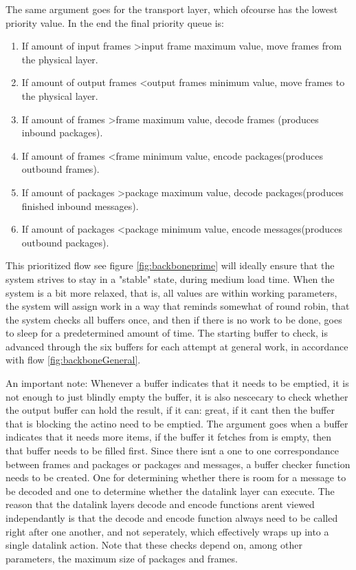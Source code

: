 The same argument goes for the transport layer, which ofcourse has the lowest priority value.
 In the end the final priority queue is:

\begin{enumerate}
\item If amount of input frames \textgreater input frame maximum value, move frames from the physical layer.
\item If amount of output frames \textless output frames minimum value, move frames to the physical layer.
\item If amount of frames \textgreater frame maximum value, decode frames (produces inbound packages).
\item If amount of frames \textless frame minimum value, encode packages(produces outbound frames).
\item If amount of packages \textgreater package maximum value, decode packages(produces finished inbound messages).
\item If amount of packages \textless package minimum value, encode messages(produces outbound packages).
\end{enumerate}
This prioritized flow see figure \ref{fig:backboneprime} will ideally ensure that the system strives to stay in a "stable" state, during medium load time.
When the system is a bit more relaxed, that is, all values are within working parameters, the system will assign work in a way that reminds somewhat of round robin, that the system checks all buffers once, and then if there is no work to be done, goes to sleep for a predetermined amount of time. The starting buffer to check, is advanced through the six buffers for each attempt at general work, in accordance with flow \ref{fig:backboneGeneral}.




An important note:
Whenever a buffer indicates that it needs to be emptied, it is not enough to just blindly empty the buffer, it is also nescecary to check whether the output buffer can hold the result, if it can: great, if it cant then the buffer that is blocking the actino need to be emptied.
The argument goes when a buffer indicates that it needs more items, if the buffer it fetches from is empty, then that buffer needs to be filled first.
Since there isnt a one to one correspondance between frames and packages or packages and messages, a buffer checker function needs to be created. One for determining whether there is room for a message to be decoded and one to determine whether the datalink layer can execute. The reason that the datalink layers decode and encode functions arent viewed independantly is that the decode and encode function always need to be called right after one another, and not seperately, which effectively wraps up into a single datalink action.
Note that these checks depend on, among other parameters, the maximum size of packages and frames.





